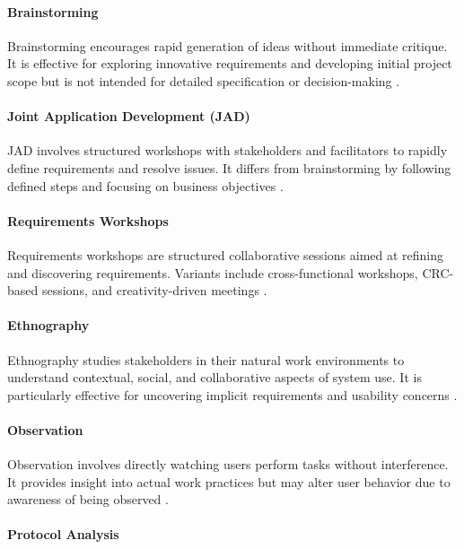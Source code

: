 \paragraph{Brainstorming}

Brainstorming encourages rapid generation of ideas without immediate critique. It is effective for exploring innovative requirements and developing initial project scope but is not intended for detailed specification or decision-making \cite{Osborn1979}.

\paragraph{Joint Application Development (JAD)}

JAD involves structured workshops with stakeholders and facilitators to rapidly define requirements and resolve issues. It differs from brainstorming by following defined steps and focusing on business objectives \cite{Wood1995}.

\paragraph{Requirements Workshops}

Requirements workshops are structured collaborative sessions aimed at refining and discovering requirements. Variants include cross-functional workshops, CRC-based sessions, and creativity-driven meetings \cite{Gottesdiener2002,Macaulay1993}.

\paragraph{Ethnography}

Ethnography studies stakeholders in their natural work environments to understand contextual, social, and collaborative aspects of system use. It is particularly effective for uncovering implicit requirements and usability concerns \cite{Ball2000,Sommerville2001}.

\paragraph{Observation}

Observation involves directly watching users perform tasks without interference. It provides insight into actual work practices but may alter user behavior due to awareness of being observed \cite{Sommerville2001}.

\paragraph{Protocol Analysis}

